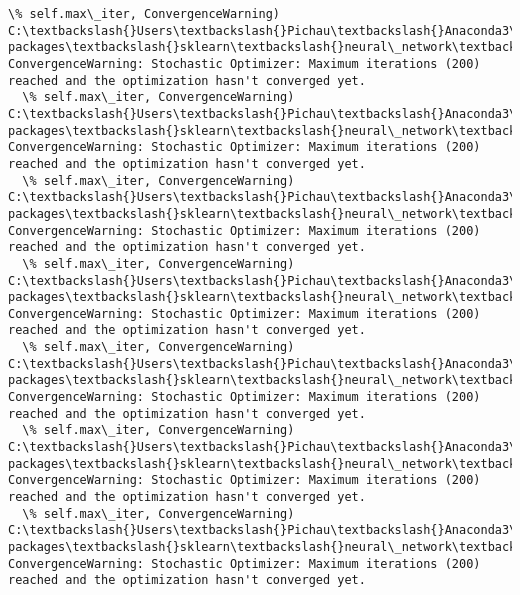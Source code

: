 \documentclass[11pt]{article}
\begin{document}
\begin{Verbatim}[commandchars=\\\{\}]
  \% self.max\_iter, ConvergenceWarning)
C:\textbackslash{}Users\textbackslash{}Pichau\textbackslash{}Anaconda3\textbackslash{}lib\textbackslash{}site-packages\textbackslash{}sklearn\textbackslash{}neural\_network\textbackslash{}multilayer\_perceptron.py:564: ConvergenceWarning: Stochastic Optimizer: Maximum iterations (200) reached and the optimization hasn't converged yet.
  \% self.max\_iter, ConvergenceWarning)
C:\textbackslash{}Users\textbackslash{}Pichau\textbackslash{}Anaconda3\textbackslash{}lib\textbackslash{}site-packages\textbackslash{}sklearn\textbackslash{}neural\_network\textbackslash{}multilayer\_perceptron.py:564: ConvergenceWarning: Stochastic Optimizer: Maximum iterations (200) reached and the optimization hasn't converged yet.
  \% self.max\_iter, ConvergenceWarning)
C:\textbackslash{}Users\textbackslash{}Pichau\textbackslash{}Anaconda3\textbackslash{}lib\textbackslash{}site-packages\textbackslash{}sklearn\textbackslash{}neural\_network\textbackslash{}multilayer\_perceptron.py:564: ConvergenceWarning: Stochastic Optimizer: Maximum iterations (200) reached and the optimization hasn't converged yet.
  \% self.max\_iter, ConvergenceWarning)
C:\textbackslash{}Users\textbackslash{}Pichau\textbackslash{}Anaconda3\textbackslash{}lib\textbackslash{}site-packages\textbackslash{}sklearn\textbackslash{}neural\_network\textbackslash{}multilayer\_perceptron.py:564: ConvergenceWarning: Stochastic Optimizer: Maximum iterations (200) reached and the optimization hasn't converged yet.
  \% self.max\_iter, ConvergenceWarning)
C:\textbackslash{}Users\textbackslash{}Pichau\textbackslash{}Anaconda3\textbackslash{}lib\textbackslash{}site-packages\textbackslash{}sklearn\textbackslash{}neural\_network\textbackslash{}multilayer\_perceptron.py:564: ConvergenceWarning: Stochastic Optimizer: Maximum iterations (200) reached and the optimization hasn't converged yet.
  \% self.max\_iter, ConvergenceWarning)
C:\textbackslash{}Users\textbackslash{}Pichau\textbackslash{}Anaconda3\textbackslash{}lib\textbackslash{}site-packages\textbackslash{}sklearn\textbackslash{}neural\_network\textbackslash{}multilayer\_perceptron.py:564: ConvergenceWarning: Stochastic Optimizer: Maximum iterations (200) reached and the optimization hasn't converged yet.
  \% self.max\_iter, ConvergenceWarning)
C:\textbackslash{}Users\textbackslash{}Pichau\textbackslash{}Anaconda3\textbackslash{}lib\textbackslash{}site-packages\textbackslash{}sklearn\textbackslash{}neural\_network\textbackslash{}multilayer\_perceptron.py:564: ConvergenceWarning: Stochastic Optimizer: Maximum iterations (200) reached and the optimization hasn't converged yet.

\end{Verbatim}
\end{document}
